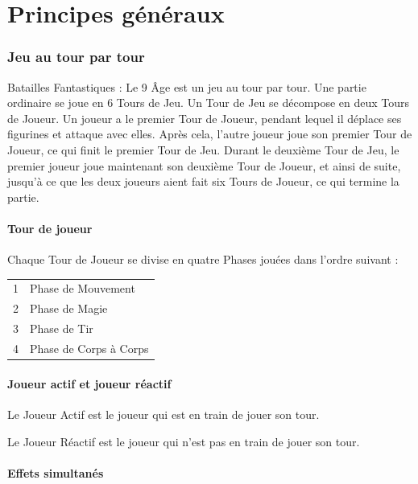 
\part{Principes généraux}

\section{Jeu au tour par tour}

Batailles Fantastiques : Le 9\ieme{} Âge est un jeu au tour par tour. Une partie ordinaire se joue en 6 Tours de Jeu. Un Tour de Jeu se décompose en deux Tours de Joueur. Un joueur a le premier Tour de Joueur, pendant lequel il déplace ses figurines et attaque avec elles. Après cela, l'autre joueur joue son premier Tour de Joueur, ce qui finit le premier Tour de Jeu. Durant le deuxième Tour de Jeu, le premier joueur joue maintenant son deuxième Tour de Joueur, et ainsi de suite, jusqu'à ce que les deux joueurs aient fait six Tours de Joueur, ce qui termine la partie.

\subsection{Tour de joueur}

Chaque Tour de Joueur se divise en quatre Phases jouées dans l'ordre suivant :

\hspace*{0.3cm}
\begin{tabular}{c|l}
1 & Phase de Mouvement \tabularnewline
2 & Phase de Magie \tabularnewline
3 & Phase de Tir \tabularnewline
4 & Phase de Corps à Corps \tabularnewline
\end{tabular}

\subsection{Joueur actif et joueur réactif}

Le Joueur Actif est le joueur qui est en train de jouer son tour.

Le Joueur Réactif est le joueur qui n'est pas en train de jouer son tour.

\subsection{Effets simultanés}

